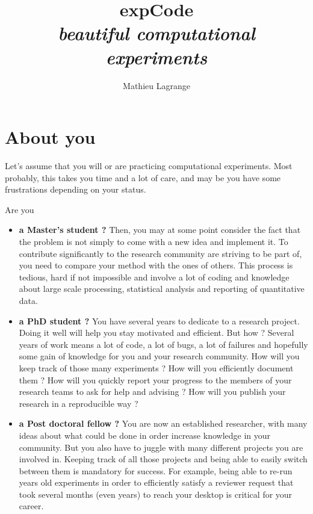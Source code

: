 \documentclass[10pt,a4paper,fleqn]{article}
\title{ \textbf{\textsf{expCode}} \\ \textit{beautiful computational experiments} }
\author{ Mathieu Lagrange }
\begin{document}
 
  
\maketitle 

\section{About you}

Let's assume that you will or are practicing computational experiments. Most probably, this takes you time and a lot of care, and may be you have some frustrations depending on your status.

Are you
\begin{itemize}
\item  \textbf{a Master's student ?} Then, you may at some point consider the fact that the problem is not simply to come with a new idea and implement it. To contribute significantly to the research community are striving to be part of, you need to compare your method with the ones of others. This process is tedious, hard if not impossible and involve a lot of coding and knowledge about large scale processing, statistical analysis and reporting of quantitative data.

\item \textbf{a PhD student ?} You have several years to dedicate to a research project. Doing it well will help you stay motivated and efficient. But how ? Several years of work means a lot of code, a lot of bugs, a lot of failures and hopefully some gain of knowledge for you and your research community. How will you keep track of those many experiments ? How will you efficiently document them ?  How will you quickly report your progress to the members of your research teams to ask for help and advising ? How will you publish your research in a reproducible way ?

\item \textbf{a Post doctoral fellow ?} You are now an established researcher, with many ideas about what could be done in order increase knowledge in your community. But you also have to juggle with many different projects you are involved in. Keeping track of all those projects and being able to easily switch between them is mandatory for success. For example, being able to re-run years old experiments in order to efficiently satisfy a reviewer request that took several months (even years) to reach your desktop is critical for your career.


\end{itemize}
\end{document}
